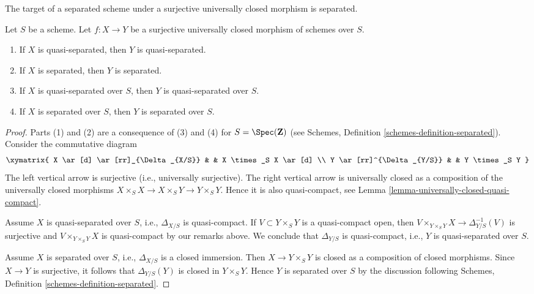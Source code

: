 \noindent
The target of a separated scheme under a surjective
universally closed morphism is separated.

\begin{lemma}
\label{lemma-image-universally-closed-separated}
Let $S$ be a scheme. Let $f : X \to Y$ be a surjective universally closed
morphism of schemes over $S$.
\begin{enumerate}
\item If $X$ is quasi-separated, then $Y$ is quasi-separated.
\item If $X$ is separated, then $Y$ is separated.
\item If $X$ is quasi-separated over $S$, then $Y$ is quasi-separated over $S$.
\item If $X$ is separated over $S$, then $Y$ is separated over $S$.
\end{enumerate}
\end{lemma}

\begin{proof}
Parts (1) and (2) are a consequence of (3) and (4) for
$S = \Spec(\mathbf{Z})$ (see
Schemes, Definition \ref{schemes-definition-separated}).
Consider the commutative diagram
$$
\xymatrix{
X \ar[d] \ar[rr]_{\Delta_{X/S}} & & X \times_S X \ar[d] \\
Y \ar[rr]^{\Delta_{Y/S}} & & Y \times_S Y
}
$$
The left vertical arrow is surjective (i.e., universally surjective).
The right vertical arrow is universally closed as a composition
of the universally closed morphisms
$X \times_S X \to X \times_S Y \to Y \times_S Y$. Hence it is also
quasi-compact, see
Lemma \ref{lemma-universally-closed-quasi-compact}.

\medskip\noindent
Assume $X$ is quasi-separated over $S$, i.e.,  $\Delta_{X/S}$ is
quasi-compact. If $V \subset Y \times_S Y$ is a quasi-compact
open, then $V \times_{Y \times_S Y} X \to \Delta_{Y/S}^{-1}(V)$
is surjective and $V \times_{Y \times_S Y} X$ is quasi-compact by our remarks
above. We conclude that $\Delta_{Y/S}$ is quasi-compact, i.e., $Y$
is quasi-separated over $S$.

\medskip\noindent
Assume $X$ is separated over $S$, i.e., $\Delta_{X/S}$ is a closed
immersion. Then $X \to Y \times_S Y$ is closed as a
composition of closed morphisms. Since $X \to Y$ is
surjective, it follows that $\Delta_{Y/S}(Y)$ is closed in $Y \times_S Y$.
Hence $Y$ is separated over $S$ by the discussion following
Schemes, Definition \ref{schemes-definition-separated}.
\end{proof}








